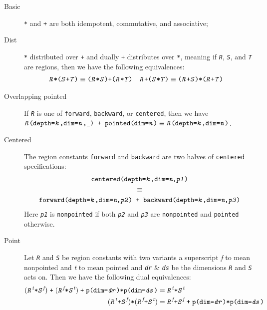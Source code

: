 \documentclass{article}
\theoremstyle{definition}
\theoremstyle{plain}
\newcommand{\textcap}[1]{\texttt{\textit{#1}}}
\begin{document}
\begin{description}
  \item[Basic] \texttt{*} and \texttt{+} are both idempotent, commutative, and
    associative;
%
  \item[Dist] \texttt{*} distributed over \texttt{+} and dually
    \texttt{+} distributes over \texttt{*}, meaning if \textcap{R}, \textcap{S},
    and \textcap{T} are regions, then we have the following equivalences:
%
    \begin{align*}
      \texttt{\textcap{R}*(\textcap{S}+\textcap{T})} & \equiv
        \texttt{(\textcap{R}*\textcap{S})+(\textcap{R}*\textcap{T})} &
      \texttt{\textcap{R}+(\textcap{S}*\textcap{T})} & \equiv
        \texttt{(\textcap{R}+\textcap{S})*(\textcap{R}+\textcap{T})}
    \end{align*}
%
  \item[Overlapping pointed] If \textcap{R} is one of \texttt{forward},
    \texttt{backward}, or \texttt{centered}, then we have
    $\texttt{\textcap{R}(depth=\textcap{k},dim=\textcap{n},\_) +
    pointed(dim=\textcap{n})} \equiv
    \texttt{\textcap{R}(depth=\textcap{k},dim=\textcap{n})}$.
%
  \item[Centered] The region constants \texttt{forward} and \texttt{backward}
    are two halves of \texttt{centered} specifications:
%
    \begin{gather*}
      \texttt{centered(depth=\textcap{k},dim=\textit{n},\textcap{p1})} \\
      \equiv \\
      \texttt{forward(depth=\textcap{k},dim=\textit{n},\textcap{p2}) +
        backward(depth=\textcap{k},dim=\textit{n},\textcap{p3})}
    \end{gather*}
%
    Here \textcap{p1} is \texttt{nonpointed} if both \textcap{p2} and
    \textcap{p3} are \texttt{nonpointed} and \texttt{pointed} otherwise.
%
  \item[Point] Let \textcap{R} and \textcap{S} be region constants with two
    variants a superscript \textit{f} to mean nonpointed and \textit{t} to mean
    pointed and \textcap{dr} \& \textcap{ds} be the dimensions \textcap{R} and
    \textcap{S} acts on. Then we have the following dual equivalences:
%
    \begin{align*}
      (\textcap{R}^{\textit{t}} \texttt{*} \textcap{S}^{\textit{f}})
      \;\texttt{+}\;
      (\textcap{R}^{\textit{f}} \texttt{*} \textcap{S}^{\textit{t}})
      \;\texttt{+}\;
      \texttt{p(dim=\textcap{dr})*p(dim=\textcap{ds})} & =
        \textcap{R}^{\textit{t}} \texttt{*} \textcap{S}^{\textit{t}} \\
%
      (\textcap{R}^{\textit{t}} \texttt{+} \textcap{S}^{\textit{f}}) \texttt{*}
      (\textcap{R}^{\textit{f}} \texttt{+} \textcap{S}^{\textit{t}}) & =
        \textcap{R}^{\textit{f}} \texttt{+} \textcap{S}^{\textit{f}}
        \;\texttt{+}\;
        \texttt{p(dim=\textcap{dr})*p(dim=\textcap{ds})}
    \end{align*}
\end{description}
\end{document}
